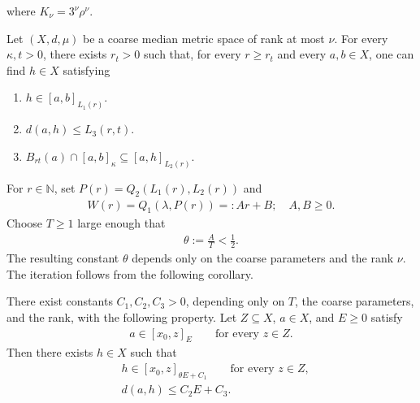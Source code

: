 \documentclass[12pt,reqno]{amsart}
\newcommand{\N}{\mathbb{N}}
\numberwithin{equation}{section}
\begin{document}
where $K_\nu=3^\nu \rho^\nu$. 
\begin{lemma}\label{lemma: wright corollary}
    Let $(X,d,\mu)$ be a coarse median metric space of rank at most $\nu$. For every $\kappa,t>0$, there exists $r_t>0$ such that, for every $r\ge r_t$ and every $a,b\in X$, one can find $h\in X$ satisfying
    \begin{enumerate}
        \item $h\in [a,b]_{L_1(r)}$.
        \item $d(a,h)\le L_3(r,t)$.
        \item $B_{rt}(a)\cap [a,b]_\kappa \subseteq [a,h]_{L_2(r)}$.
    \end{enumerate}
\end{lemma}
For $r\in\N$, set $P(r)=Q_2(L_1(r),L_2(r))$ and 
\begin{align*}
    W(r)=Q_1(\lambda, P(r))=: Ar+B;\quad A,B\ge 0.
\end{align*}
Choose $T\ge 1$ large enough that
\begin{align*}
    \theta:=\frac{A}{T}<\frac{1}{2}.
\end{align*}
The resulting constant $\theta$ depends only on the coarse parameters and the rank $\nu$. The iteration follows from the following corollary.
\begin{corollary}\label{corollary: iterative procedure}
    There exist constants $C_1,C_2,C_3>0$, depending only on $T$, the coarse parameters, and the rank, with the following property. Let $Z\subseteq X$, $a\in X$, and $E\ge 0$ satisfy
    \begin{align*}
        a\in [x_0,z]_E\qquad\text{for every }z\in Z.
    \end{align*}
    Then there exists $h\in X$ such that
    \begin{align*}
        &h\in [x_0,z]_{\theta E+C_1}\qquad\text{for every }z\in Z,\\
        &d(a,h)\le C_2E+C_3.
    \end{align*}
\end{corollary}
\end{document}
